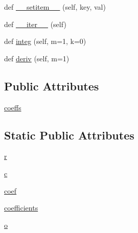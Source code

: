 \begin{DoxyCompactItemize}
\item 
def \hyperlink{classnumpy_1_1lib_1_1polynomial_1_1poly1d_aed83dbd1259c24ffa6df31a8739e6133}{\+\_\+\+\_\+setitem\+\_\+\+\_\+} (self, key, val)
\item 
def \hyperlink{classnumpy_1_1lib_1_1polynomial_1_1poly1d_a0ee2c44f32a666e3f704c3412a5f05bc}{\+\_\+\+\_\+iter\+\_\+\+\_\+} (self)
\item 
def \hyperlink{classnumpy_1_1lib_1_1polynomial_1_1poly1d_af77837d401a22d0cd55d219b485d4078}{integ} (self, m=1, k=0)
\item 
def \hyperlink{classnumpy_1_1lib_1_1polynomial_1_1poly1d_a7ea6d16d9d0e476669008d943aaa6ce6}{deriv} (self, m=1)
\end{DoxyCompactItemize}
\subsection*{Public Attributes}
\begin{DoxyCompactItemize}
\item 
\hyperlink{classnumpy_1_1lib_1_1polynomial_1_1poly1d_a63cb7e7c9dbe9f123927d90b0dd5f239}{coeffs}
\end{DoxyCompactItemize}
\subsection*{Static Public Attributes}
\begin{DoxyCompactItemize}
\item 
\hyperlink{classnumpy_1_1lib_1_1polynomial_1_1poly1d_a94878855e33ca80a7152ae43aea52b50}{r}
\item 
\hyperlink{classnumpy_1_1lib_1_1polynomial_1_1poly1d_a1ba82ddcf6d5b3c418cb566233f2f97d}{c}
\item 
\hyperlink{classnumpy_1_1lib_1_1polynomial_1_1poly1d_ac947806b3788956c85d02dae1567596a}{coef}
\item 
\hyperlink{classnumpy_1_1lib_1_1polynomial_1_1poly1d_ad20216c5ce0622785bb978377393909f}{coefficients}
\item 
\hyperlink{classnumpy_1_1lib_1_1polynomial_1_1poly1d_ac1c11f66919700baa52c51da78b0fce7}{o}
\end{DoxyCompactItemize}


